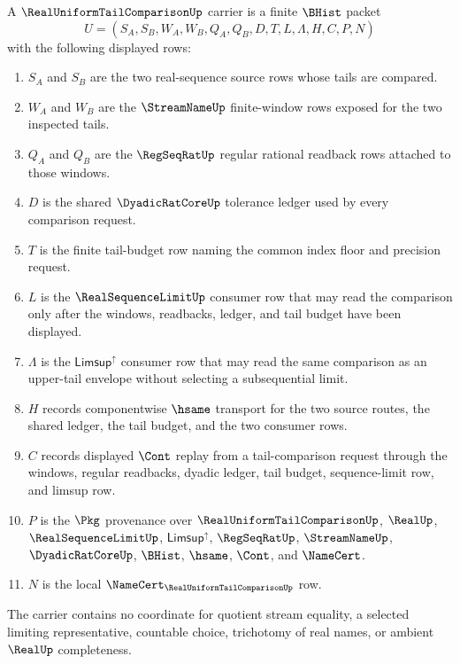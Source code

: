 \begin{definition}
\label{def:real-uniform-tail-comparison-carrier}
A $\RealUniformTailComparisonUp$ carrier is a finite $\BHist$ packet
$$
U=(S_A,S_B,W_A,W_B,Q_A,Q_B,D,T,L,\Lambda,H,C,P,N)
$$
with the following displayed rows:
\begin{enumerate}
\item $S_A$ and $S_B$ are the two real-sequence source rows whose tails are compared.
\item $W_A$ and $W_B$ are the $\StreamNameUp$ finite-window rows exposed for the two inspected tails.
\item $Q_A$ and $Q_B$ are the $\RegSeqRatUp$ regular rational readback rows attached to those windows.
\item $D$ is the shared $\DyadicRatCoreUp$ tolerance ledger used by every comparison request.
\item $T$ is the finite tail-budget row naming the common index floor and precision request.
\item $L$ is the $\RealSequenceLimitUp$ consumer row that may read the comparison only after the windows, readbacks, ledger, and tail budget have been displayed.
\item $\Lambda$ is the $\mathsf{Limsup}^{\uparrow}$ consumer row that may read the same comparison as an upper-tail envelope without selecting a subsequential limit.
\item $H$ records componentwise $\hsame$ transport for the two source routes, the shared ledger, the tail budget, and the two consumer rows.
\item $C$ records displayed $\Cont$ replay from a tail-comparison request through the windows, regular readbacks, dyadic ledger, tail budget, sequence-limit row, and limsup row.
\item $P$ is the $\Pkg$ provenance over $\RealUniformTailComparisonUp$, $\RealUp$, $\RealSequenceLimitUp$, $\mathsf{Limsup}^{\uparrow}$, $\RegSeqRatUp$, $\StreamNameUp$, $\DyadicRatCoreUp$, $\BHist$, $\hsame$, $\Cont$, and $\NameCert$.
\item $N$ is the local $\NameCert_{\RealUniformTailComparisonUp}$ row.
\end{enumerate}
The carrier contains no coordinate for quotient stream equality, a selected limiting representative, countable choice, trichotomy of real names, or ambient $\RealUp$ completeness.
\end{definition}

